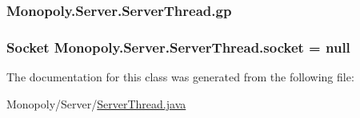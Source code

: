 \subsubsection[{\texorpdfstring{gp}{gp}}]{ Monopoly.\+Server.\+Server\+Thread.\+gp\hspace{0.3cm}{\ttfamily [private]}}\hypertarget{class_monopoly_1_1_server_1_1_server_thread_a1f3548c7768315759bdc1a5d3f6761c4}{}\label{class_monopoly_1_1_server_1_1_server_thread_a1f3548c7768315759bdc1a5d3f6761c4}
\subsubsection[{\texorpdfstring{socket}{socket}}]{\setlength{\rightskip}{0pt plus 5cm}Socket Monopoly.\+Server.\+Server\+Thread.\+socket = null\hspace{0.3cm}{\ttfamily [private]}}\hypertarget{class_monopoly_1_1_server_1_1_server_thread_a19c9a9d75155a759aa029544141ee09a}{}\label{class_monopoly_1_1_server_1_1_server_thread_a19c9a9d75155a759aa029544141ee09a}


The documentation for this class was generated from the following file\+:\begin{DoxyCompactItemize}
\item 
Monopoly/\+Server/\hyperlink{_server_thread_8java}{Server\+Thread.\+java}\end{DoxyCompactItemize}
